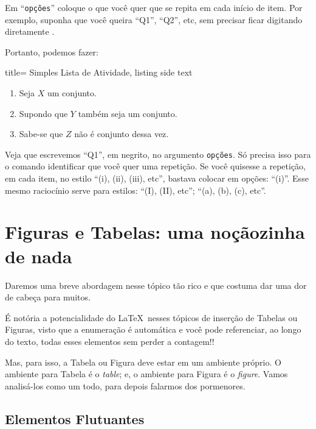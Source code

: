 Em ``\texttt{opções}'' coloque o que você quer que se repita em cada início de item.
Por exemplo, suponha que você queira ``Q1'', ``Q2'', etc, sem 
precisar ficar digitando diretamente .

Portanto, podemos fazer: 

\begin{tcblisting}{title= Simples Lista de Atividade, listing side text}
\begin{enumerate}[\textbf{Q1}]
  \item Seja $X$ um conjunto.
  \item Supondo que $Y$ também seja um conjunto.
  \item Sabe-se que $Z$ não é conjunto dessa vez.
\end{enumerate}
\end{tcblisting}

Veja que escrevemos ``Q1'', em negrito, no argumento \texttt{opções}.
Só precisa isso para o comando identificar que você quer uma repetição.
Se você quisesse a repetição, em cada item, no estilo ``(i), (ii), (iii), etc'', 
bastava colocar em opções: ``(i)''.
Esse mesmo raciocínio serve para estilos: ``(I), (II), etc''; ``(a), (b), (c), etc''.

%
  \section{Figuras e Tabelas: uma noçãozinha de nada} %
  \label{sec:figTab}
%
Daremos uma breve abordagem nesse tópico tão rico e que costuma dar uma dor de 
cabeça para muitos. 

É notória a potencialidade do \LaTeX\ nesses tópicos de inserção de Tabelas ou
Figuras, visto que a enumeração é automática e você pode referenciar, ao longo
do texto, todas esses elementos sem perder a contagem!!

Mas, para isso, a \textsf{Tabela} ou \textsf{Figura} deve estar em um ambiente 
próprio. 
O ambiente para Tabela é o \textit{table}; e, o ambiente para Figura é o \textit{figure}. 
Vamos analisá-los como um todo, para depois falarmos dos pormenores.

%
  \subsection{Elementos Flutuantes}
%

